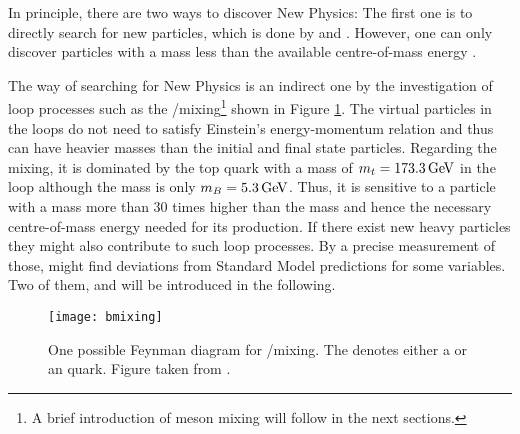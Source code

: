 In principle, there are two ways to discover New Physics:
The first one is to directly search for new particles, which is done by \atlas and \cms.
However, one can only discover particles with a mass less than the available centre-of-mass energy \sqs.

The \lhcb way of searching for New Physics is an indirect one by the investigation of loop processes such as the \B/\Bbar mixing\footnote{A brief introduction of meson mixing will follow in the next sections.} shown in Figure \ref{fig:Bmixing}.
The virtual particles in the loops do not need to satisfy Einstein's energy-momentum relation and thus can have heavier masses than the initial and final state particles.
Regarding the \B mixing, it is dominated by the top quark with a mass of $m_t = 173.3 \mathrm{\,Ge\kern -0.1em V}$ in the loop although the \B mass is only $m_{B} = 5.3\mathrm{\,Ge\kern -0.1em V}$.
Thus, it is sensitive to a particle with a mass more than 30 times higher than the \B mass and hence the necessary centre-of-mass energy needed for its production.
If there exist new heavy particles they might also contribute to such loop processes.
By a precise measurement of those, \lhcb might find deviations from Standard Model predictions for some variables.
Two of them, \asld and \Vub will be introduced in the following.
\begin{figure}[tb]
    \centering
	\texttt{[image: bmixing]}	
	\caption{One possible Feynman diagram for \B/\Bbar mixing. The \quark denotes either a \dquark or an \squark quark. Figure taken from \cite{LHCb_roadmap}.}
	\label{fig:Bmixing}
\end{figure}

